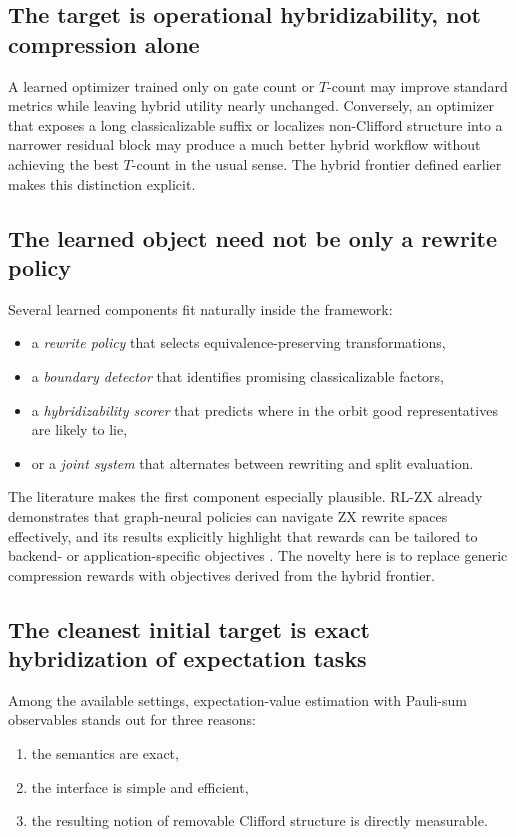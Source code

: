 \documentclass[11pt]{article}
\theoremstyle{remark}
\begin{document}
\subsection{The target is operational hybridizability, not compression alone}

A learned optimizer trained only on gate count or $T$-count may improve standard metrics while leaving hybrid utility nearly unchanged. Conversely, an optimizer that exposes a long classicalizable suffix or localizes non-Clifford structure into a narrower residual block may produce a much better hybrid workflow without achieving the best $T$-count in the usual sense. The hybrid frontier defined earlier makes this distinction explicit.

\subsection{The learned object need not be only a rewrite policy}

Several learned components fit naturally inside the framework:
\begin{itemize}[leftmargin=1.5em]
    \item a \emph{rewrite policy} that selects equivalence-preserving transformations,
    \item a \emph{boundary detector} that identifies promising classicalizable factors,
    \item a \emph{hybridizability scorer} that predicts where in the orbit good representatives are likely to lie,
    \item or a \emph{joint system} that alternates between rewriting and split evaluation.
\end{itemize}

The literature makes the first component especially plausible. RL-ZX already demonstrates that graph-neural policies can navigate ZX rewrite spaces effectively, and its results explicitly highlight that rewards can be tailored to backend- or application-specific objectives \cite{rlzx_2025}. The novelty here is to replace generic compression rewards with objectives derived from the hybrid frontier.

\subsection{The cleanest initial target is exact hybridization of expectation tasks}

Among the available settings, expectation-value estimation with Pauli-sum observables stands out for three reasons:
\begin{enumerate}[label=(\alph*), leftmargin=1.5em]
    \item the semantics are exact,
    \item the interface is simple and efficient,
    \item the resulting notion of removable Clifford structure is directly measurable.
\end{enumerate}
\end{document}
